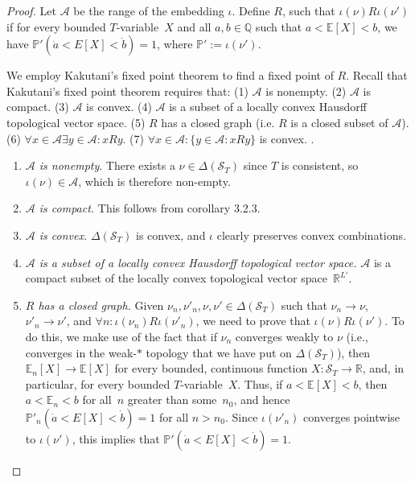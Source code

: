 \documentclass[12pt]{article}
\newcommand{\PP}{\mathbb{P}}
\newcommand{\EE}{\mathbb{E}}
\newcommand{\RR}{\mathbb{R}}
\newcommand{\QQ}{\mathbb{Q}}
\newcommand{\cA}{\mathcal{A}}
\newcommand{\cS}{\mathcal{S}}
\newcommand{\Tvar}{$T$-variable}
\theoremstyle{plain}
\theoremstyle{definition}
\theoremstyle{remark}
\begin{document}
\begin{proof}
Let $\cA$ be the range of the embedding $\iota$. Define $R$, such that $\iota(\nu)R\iota(\nu')$ if for every bounded \Tvar{}~$X$ and all $a,b\in\QQ$ such that $a<\EE[X]<b$, we have $\PP'(\dot a < E[X] < \dot b)= 1$, where $\PP':=\iota(\nu')$.

We employ Kakutani's fixed point theorem to find a fixed point of $R$. Recall that Kakutani's fixed point theorem requires that:
(1) $\mathcal{A}$ is nonempty.
(2) $\mathcal{A}$ is compact.
(3) $\mathcal{A}$ is convex.
(4) $\mathcal{A}$ is a subset of a locally convex Hausdorff topological vector space.
(5) $R$ has a closed graph (i.e. $R$ is a closed subset of $\cA$).
(6) $\forall x\in\cA \exists y\in\cA : xRy$.
(7) $\forall x\in\cA:\{y \in \mathcal{A}: xRy\}$ is convex.
\cite{kakutani41}.

\begin{enumerate}
\item \emph{$\mathcal{A}$ is nonempty}. There exists a $\nu\in\Delta(\cS_T)$ since $T$ is consistent, so $\iota(\nu)\in\cA$, which is therefore non-empty.

\item \emph{$\mathcal{A}$ is compact.} This follows from corollary 3.2.3.

\item \emph{$\mathcal{A}$ is convex.} $\Delta(\cS_T)$ is convex, and $\iota$ clearly preserves convex combinations.

\item \emph{$\mathcal{A}$ is a subset of a locally convex Hausdorff topological vector space.} $\mathcal{A}$ is a compact subset of the locally convex topological vector space~$\RR^{L'}$.

\item \emph{$R$ has a closed graph.} Given $\nu_n,\nu'_n,\nu,\nu'\in\Delta(\cS_T)$ such that $\nu_n\to\nu$, $\nu'_n\to\nu'$, and $\forall n : \iota(\nu_n)R\iota(\nu'_n)$, we need to prove that $\iota(\nu)R\iota(\nu')$. 
To do this, we make use of the fact that if $\nu_n$ converges weakly to $\nu$ (i.e., converges in the weak-$*$ topology that we have put on $\Delta(\cS_T)$), then $\EE_n[X]\to\EE[X]$ for every bounded, continuous function $X : \cS_T\to\RR$, and, in particular, for every bounded \Tvar{}~$X$. 
Thus, if $a < \EE[X] < b$, then $a < \EE_n < b$ for all~$n$ greater than some~$n_0$, and hence $\PP'_n(\dot a < E[X] < \dot b) = 1$ for all $n>n_0$.
Since $\iota(\nu'_n)$ converges pointwise to $\iota(\nu')$, this implies that $\PP'(\dot a < E[X] < \dot b) = 1$.


\end{enumerate}
\end{proof}
\end{document}
